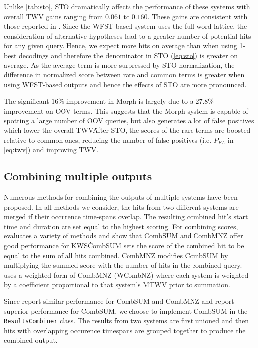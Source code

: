 \documentclass[a4paper,oneside,reqno]{amsart}
\begin{document}
Unlike \autoref{tab:sto}, STO dramatically affects the performance of these
systems with overall TWV gains ranging from $0.061$ to $0.160$. These gains are
consistent with those reported in \cite{mamou2013system}. Since the WFST-based
system uses the full word-lattice, the consideration of alternative hypotheses
lead to a greater number of potential hits for any given query. Hence, we
expect more hits on average than when using 1-best decodings and therefore the
denominator in STO (\autoref{eq:sto}) is greater on average. As the average
term is more surpressed by STO normalization, the difference in normalized
score between rare and common terms is greater when using WFST-based outputs
and hence the effects of STO are more pronounced.

The significant $16\%$ improvement in Morph is largely due to a $27.8\%$
improvement on OOV terms. This suggests that the Morph system is capable of
spotting a large number of OOV queries, but also generates a lot of false
positives which lower the overall TWV\. After STO, the scores of the rare
terms are boosted relative to common ones, reducing the number of false
positives (i.e. $P_{FA}$ in \autoref{eq:twv}) and improving TWV.

\subsection{Combining multiple outputs}

Numerous methods for combining the outputs of multiple systems have been
proposed. In all methods we consider, the hits from two different systems are
merged if their occurence time-spans overlap. The resulting combined hit's
start time and duration are set equal to the highest scoring. For combining
scores, \cite{soto2014comparison} evaluates a variety of methods and show that
CombSUM and CombMNZ offer good performance for KWS\. CombSUM sets the score of
the combined hit to be equal to the sum of all hits combined. CombMNZ modifies
CombSUM by multiplying the summed score with the number of hits in the combined
query. \cite{mamou2013system} uses a weighted form of CombMNZ (WCombNZ) where
each system is weighted by a coefficient proportional to that system's MTWV
prior to summation.

Since \cite{soto2014comparison} report similar performance for CombSUM and
CombMNZ and \cite{belkin1995combining} report superior performance for CombSUM,
we choose to implement CombSUM in the \texttt{ResultsCombiner} class. The
results from two systems are first unioned and then hits with overlapping
occurence timespans are grouped together to produce the combined output.
\end{document}
